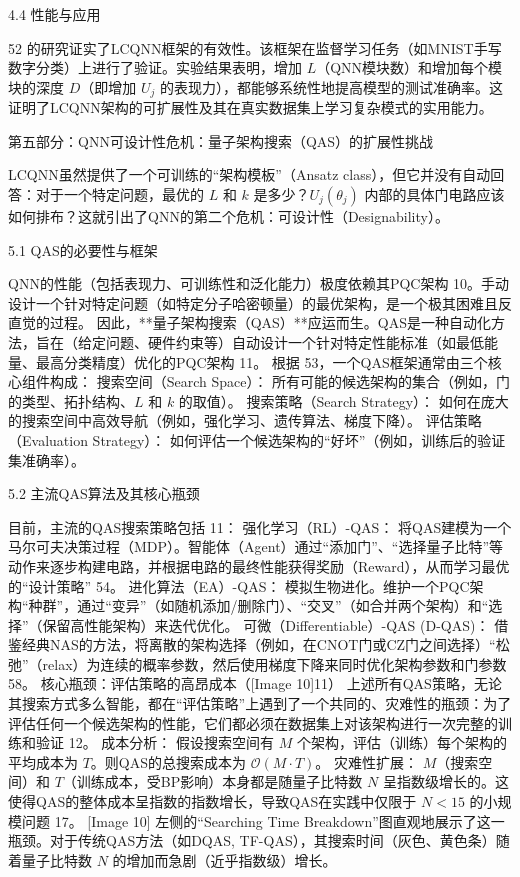 \documentclass[12pt,a4paper]{article}
\begin{document}
4.4 性能与应用

52 的研究证实了LCQNN框架的有效性。该框架在监督学习任务（如MNIST手写数字分类）上进行了验证。实验结果表明，增加 $L$（QNN模块数）和增加每个模块的深度 $D$（即增加 $U_j$ 的表现力），都能够系统性地提高模型的测试准确率。这证明了LCQNN架构的可扩展性及其在真实数据集上学习复杂模式的实用能力。

第五部分：QNN可设计性危机：量子架构搜索（QAS）的扩展性挑战

LCQNN虽然提供了一个可训练的“架构模板”（Ansatz class），但它并没有自动回答：对于一个特定问题，最优的 $L$ 和 $k$ 是多少？$U_j(\theta_j)$ 内部的具体门电路应该如何排布？这就引出了QNN的第二个危机：可设计性（Designability）。

5.1 QAS的必要性与框架

QNN的性能（包括表现力、可训练性和泛化能力）极度依赖其PQC架构 10。手动设计一个针对特定问题（如特定分子哈密顿量）的最优架构，是一个极其困难且反直觉的过程。
因此，**量子架构搜索（QAS）**应运而生。QAS是一种自动化方法，旨在（给定问题、硬件约束等）自动设计一个针对特定性能标准（如最低能量、最高分类精度）优化的PQC架构 11。
根据 53，一个QAS框架通常由三个核心组件构成：
搜索空间（Search Space）： 所有可能的候选架构的集合（例如，门的类型、拓扑结构、$L$ 和 $k$ 的取值）。
搜索策略（Search Strategy）： 如何在庞大的搜索空间中高效导航（例如，强化学习、遗传算法、梯度下降）。
评估策略（Evaluation Strategy）： 如何评估一个候选架构的“好坏”（例如，训练后的验证集准确率）。

5.2 主流QAS算法及其核心瓶颈

目前，主流的QAS搜索策略包括 11：
强化学习（RL）-QAS： 将QAS建模为一个马尔可夫决策过程（MDP）。智能体（Agent）通过“添加门”、“选择量子比特”等动作来逐步构建电路，并根据电路的最终性能获得奖励（Reward），从而学习最优的“设计策略” 54。
进化算法（EA）-QAS： 模拟生物进化。维护一个PQC架构“种群”，通过“变异”（如随机添加/删除门）、“交叉”（如合并两个架构）和“选择”（保留高性能架构）来迭代优化。
可微（Differentiable）-QAS (D-QAS)： 借鉴经典NAS的方法，将离散的架构选择（例如，在CNOT门或CZ门之间选择）“松弛”（relax）为连续的概率参数，然后使用梯度下降来同时优化架构参数和门参数 58。
核心瓶颈：评估策略的高昂成本（[Image 10]11）
上述所有QAS策略，无论其搜索方式多么智能，都在“评估策略”上遇到了一个共同的、灾难性的瓶颈：为了评估任何一个候选架构的性能，它们都必须在数据集上对该架构进行一次完整的训练和验证 12。
成本分析： 假设搜索空间有 $M$ 个架构，评估（训练）每个架构的平均成本为 $T$。则QAS的总搜索成本为 $\mathcal{O}(M \cdot T)$。
灾难性扩展： $M$（搜索空间）和 $T$（训练成本，受BP影响）本身都是随量子比特数 $N$ 呈指数级增长的。这使得QAS的整体成本呈指数的指数增长，导致QAS在实践中仅限于 $N < 15$ 的小规模问题 17。
[Image 10] 左侧的“Searching Time Breakdown”图直观地展示了这一瓶颈。对于传统QAS方法（如DQAS, TF-QAS），其搜索时间（灰色、黄色条）随着量子比特数 $N$ 的增加而急剧（近乎指数级）增长。
\end{document}
